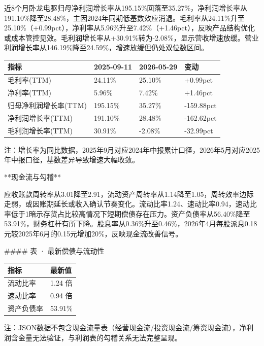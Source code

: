 \documentclass[12pt,a4paper]{article}
\begin{document}
近8个月卧龙电驱归母净利润增长率从195.15\%回落至35.27\%，净利润增长率从191.10\%降至28.48\%，主因2024年同期低基数效应消退。毛利率从24.11\%升至25.10\%（+0.99pct），净利率从5.96\%升至7.42\%（+1.46pct），反映产品结构优化或成本管控见效。毛利润增长率从+30.91\%转为-2.08\%，显示营收增速放缓。营业利润增长率从146.19\%降至24.59\%，增速放缓但仍处双位数区间。

\begin{table}[htbp]
\centering
\begin{tabular}{llll}
\toprule
指标 & 2025-09-11 & 2026-05-29 & 变动 \\
\midrule
毛利率(TTM) & 24.11\% & 25.10\% & +0.99pct \\
净利率(TTM) & 5.96\% & 7.42\% & +1.46pct \\
归母净利润增长率(TTM) & 195.15\% & 35.27\% & -159.88pct \\
净利润增长率(TTM) & 191.10\% & 28.48\% & -162.62pct \\
毛利润增长率(TTM) & 30.91\% & -2.08\% & -32.99pct \\
\bottomrule
\end{tabular}
\end{table}


注：增长率为同比数据，2025年9月对应2024年中报累计口径，2026年5月对应2025年中报口径，基数差异导致增速大幅收敛。

**现金流与勾稽**

应收账款周转率从3.01降至2.91，流动资产周转率从1.14降至1.05，周转效率边际走弱，或因账期延长或收入确认节奏变化。流动比率1.24、速动比率0.94，速动比率低于1暗示存货占比较高情况下短期偿债存在压力。资产负债率从56.40\%降至53.91\%，财务杠杆有所下降。股息率从0.36\%升至0.46\%，2026年4月每股派息0.18元较2025年6月的0.15元增加20\%，反映现金流改善信号。

\#\#\#\# 表 · 最新偿债与流动性

\begin{table}[htbp]
\centering
\begin{tabular}{ll}
\toprule
指标 & 最新值 \\
\midrule
流动比率 & 1.24 倍 \\
速动比率 & 0.94 倍 \\
资产负债率 & 53.91\% \\
\bottomrule
\end{tabular}
\end{table}


注：JSON数据不包含现金流量表（经营现金流/投资现金流/筹资现金流），净利润含金量无法验证，与利润表的勾稽关系无法完整呈现。
\end{document}
